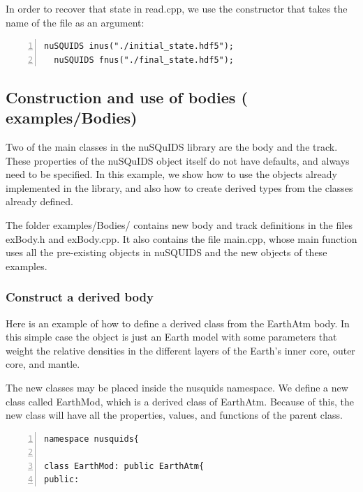 \documentclass[3p,12pt]{elsarticle}
\newcommand{\ttf}{\ttfamily}
\begin{document}
In order to recover that state in {\ttf read.cpp}, we use the
constructor that takes the name of the file as an argument:

\begin{lstlisting}[frame=leftline, numbers =
  left,breaklines=true,label = ex:sin1]
  nuSQUIDS inus("./initial_state.hdf5");
  nuSQUIDS fnus("./final_state.hdf5"); 
\end{lstlisting}


\subsection{Construction and use of bodies \textnormal{({\ttf
      examples/Bodies})}}
\label{sec:body}
Two of the main classes in the {\ttf nuSQuIDS} library are the body and the
track. 
These properties of the {\ttf nuSQuIDS} object itself do not have defaults, and always need to
be specified.
In this example, we show how to use the objects already implemented in
the library, and also how to create derived types from the classes
already defined.

The folder {\ttf examples/Bodies/} contains new body and track definitions
in the files {\ttf exBody.h} and {\ttf exBody.cpp}.
It also contains the file {\ttf main.cpp}, whose main function 
uses all the pre-existing objects in nuSQUIDS and the new objects
of these examples.


\subsubsection{Construct a derived body}

Here is an example of how to define a derived class from the EarthAtm
body. In this simple case the object is just an Earth model with some
parameters that weight the relative densities in the different layers
of the Earth's inner core, outer core, and mantle.

The new classes may be placed inside the {\ttf nusquids}
namespace. We define a new class called {\ttf EarthMod}, which is a derived class of {\ttf
  EarthAtm}. Because of this, the new class will have all the properties,
values, and functions of the parent class. 
\begin{lstlisting}[frame=leftline, numbers = left,breaklines=true,label = ex:sin1]
namespace nusquids{

class EarthMod: public EarthAtm{
public:
\end{lstlisting}
\end{document}
